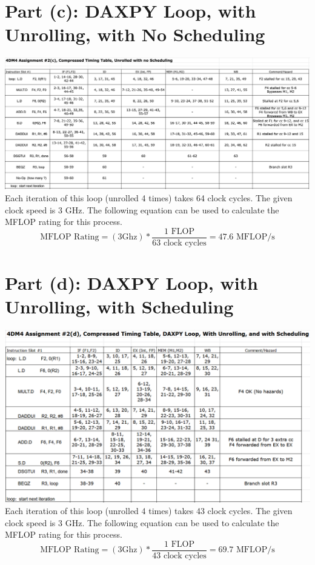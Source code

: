 \documentclass[12pt, letterpaper, titlepage, hidelinks]{article}
\begin{document}
\section{Part (c): DAXPY Loop, with Unrolling, with No Scheduling}
	\includegraphics[width=\textwidth]{2c-new}
	Each iteration of this loop (unrolled 4 times) takes 64 clock cycles. The given clock speed is 3 GHz. The following equation can be used to calculate the MFLOP rating for this process.
	\begin{equation}
		\text{MFLOP Rating} = (3 \text{{Ghz}}) * \frac{1 \text{ FLOP}}{63 \text{ clock cycles}} = 47.6 \text{ MFLOP/s}
	\end{equation}

\section{Part (d): DAXPY Loop, with Unrolling, with Scheduling}
	\includegraphics[width=\textwidth]{2d}
	Each iteration of this loop (unrolled 4 times) takes 43 clock cycles. The given clock speed is 3 GHz. The following equation can be used to calculate the MFLOP rating for this process.
	\begin{equation}
		\text{MFLOP Rating} = (3 \text{{Ghz}}) * \frac{1 \text{ FLOP}}{43 \text{ clock cycles}} = 69.7 \text{ MFLOP/s}
	\end{equation}
\end{document}
